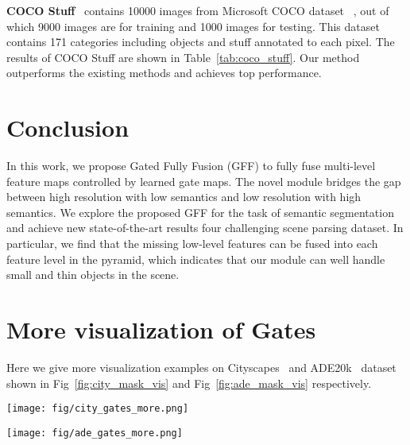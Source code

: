 \documentclass[letterpaper]{article} \usepackage{aaai20}  \usepackage{times}  \usepackage{helvet} \usepackage{courier}  \usepackage[hyphens]{url}  \usepackage{graphicx} \urlstyle{rm} \def\UrlFont{\rm}  \usepackage{graphicx}  \usepackage{amsmath}
\begin{document}
\noindent
\textbf{COCO Stuff}~\cite{coco_stuff} contains 10000 images from Microsoft
COCO dataset ~\cite{COCO_dataset}, out of which 9000 images are for
training and 1000 images for testing. This dataset contains 171 categories including objects and stuff annotated to each pixel. The results of COCO Stuff are shown in Table~\ref{tab:coco_stuff}. Our method outperforms the existing methods and achieves top performance.
 \section{Conclusion}
\label{conclusion}
In this work, we propose Gated Fully Fusion (GFF) to fully fuse multi-level feature maps controlled by learned gate maps. The novel module bridges the gap between high resolution with low semantics and low resolution with high semantics. We explore the proposed GFF for the task of semantic segmentation and achieve new state-of-the-art results four challenging scene parsing dataset. In particular, we find that the missing low-level features can be fused into each feature level in the pyramid, which indicates that our module can well handle small and thin objects in the scene. 
%
 
{\small


}

\section{More visualization of Gates}
Here we give more visualization examples on Cityscapes~\cite{Cityscapes} and ADE20k~\cite{ADE20K} dataset shown in Fig~\ref{fig:city_mask_vis} and Fig~\ref{fig:ade_mask_vis} respectively. 

    
\begin{figure*}
\centering
\texttt{[image: fig/city\_gates\_more.png]}
\caption{
More visualization of learned gate maps on Cityscapes dataset.  represents the output of  layer's gate. It shows the gate control the information propagation. Best view in color and zoom in for detailed information.}
\label{fig:city_mask_vis}
\end{figure*}


\begin{figure*}
\centering
\texttt{[image: fig/ade\_gates\_more.png]}
\caption{More more visualization of learned gate maps on ADE20K dataset.  represents the gate map of the th layer. Best view in color and zoom in for detailed information.}
\label{fig:ade_mask_vis}
\end{figure*}
\end{document}
